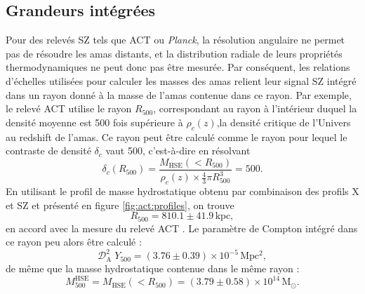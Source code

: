 \subsection{Grandeurs intégrées}

Pour des relevés SZ tels que ACT ou \textit{Planck}, la résolution angulaire ne permet pas de résoudre les amas distants, et la distribution radiale de leurs propriétés thermodynamiques ne peut donc pas être mesurée.
Par conséquent, les relations d'échelles utilisées pour calculer les masses des amas relient leur signal SZ intégré dans un rayon donné à la masse de l'amas contenue dans ce rayon.
Par exemple, le relevé ACT \cite{hasselfield_atacama_2013} utilise le rayon $R_{500}$, correspondant au rayon à l'intérieur duquel la densité moyenne est 500 fois supérieure à $\rho_c(z)$,la densité critique de l'Univers au redshift de l'amas.
Ce rayon peut être calculé comme le rayon pour lequel le contraste de densité $\delta_c$ vaut 500, c'est-à-dire en résolvant
\begin{equation}
    \delta_c(R_{500}) = \frac{M_\mathrm{HSE}(<R_{500})}{\rho_c(z) \times \frac{4}{3} \pi R_{500}^3} = 500.
\end{equation}
En utilisant le profil de masse hydrostatique obtenu par combinaison des profils X et SZ et présenté en figure \ref{fig:act:profiles}, on trouve
\begin{equation}
    R_{500} = 810.1 \pm 41.9 \, \mathrm{kpc},
\end{equation}
en accord avec la mesure du relevé ACT \cite{hasselfield_atacama_2013}.
Le paramètre de Compton intégré dans ce rayon peu alors être calculé :
\begin{equation}
    \mathcal{D}_\mathrm{A}^2 \; Y_{500} = (3.76 \pm 0.39)\times 10^{-5} \,\mathrm{Mpc^2},
\end{equation}
de même que la masse hydrostatique contenue dans le même rayon :
\begin{equation}
    M^\mathrm{HSE}_{500} = M_\mathrm{HSE}(<R_{500}) = (3.79 \pm 0.58) \times 10^{14} \,\mathrm{M}_\odot.
\end{equation}

